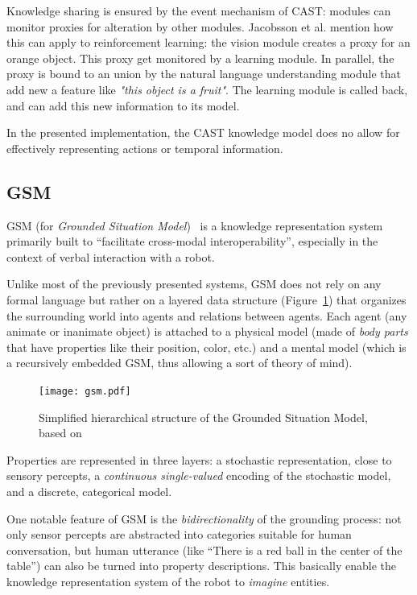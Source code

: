 \documentclass[a4paper, twocolumn]{article}
\begin{document}
Knowledge sharing is ensured by the event mechanism of CAST: modules can
monitor proxies for alteration by other modules. Jacobsson et al. mention how
this can apply to reinforcement learning: the vision module creates a proxy for
an orange object. This proxy get monitored by a learning module. In parallel,
the proxy is bound to an union by the natural language understanding module
that add new a feature like \emph{"this object is a fruit"}. The learning
module is called back, and can add this new information to its model.

In the presented implementation, the CAST knowledge model does no allow for
effectively representing actions or temporal information.

\subsection{GSM}
\label{sect|gsm}

GSM (for \emph{Grounded Situation Model})~\cite{Mavridis2006} is a knowledge
representation system primarily built to ``facilitate cross-modal
interoperability'',  especially in the context of verbal interaction with a
robot.

Unlike most of the previously presented systems, GSM does not rely on any
formal language but rather on a layered data structure (Figure~\ref{fig|gsm})
that organizes the surrounding world into agents and relations between agents.
Each agent (any animate or inanimate object) is attached to a physical model (made
of \emph{body parts} that have properties like their position, color, etc.) and
a mental model (which is a recursively embedded GSM, thus allowing a sort of
theory of mind).

\begin{figure}
    \centering
    \texttt{[image: gsm.pdf]}

    \caption{Simplified hierarchical structure of the Grounded Situation Model,
    based on~\cite{Mavridis2006}}

    \label{fig|gsm}
\end{figure}

Properties are represented in three layers: a stochastic representation, close
to sensory percepts, a \emph{continuous single-valued} encoding of the
stochastic model, and a discrete, categorical model.

One notable feature of GSM is the \emph{bidirectionality} of the grounding
process: not only sensor percepts are abstracted into categories suitable for
human conversation, but human utterance (like ``There is a red ball in the
center of the table'') can also be turned into property descriptions. This
basically enable the knowledge representation system of the robot to
\emph{imagine} entities.
\end{document}
